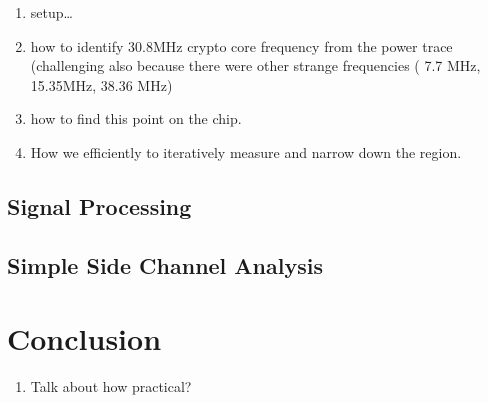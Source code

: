 \documentclass{llncs}
\begin{document}
\begin{enumerate}
  \item  setup\ldots 
  \item how to identify 30.8MHz crypto core frequency from the power trace (challenging also because there were other strange frequencies ( 7.7 MHz, 15.35MHz, 38.36 MHz)
  \item how to find this point on the chip. 
  \item How we efficiently to iteratively measure and narrow down the region.
\end{enumerate}


\subsection{Signal Processing}




\subsection{Simple Side Channel Analysis}




\section{Conclusion}

\begin{enumerate}
  \item Talk about how practical?
\end{enumerate}




% 
% 
% 
% 
\end{document}
